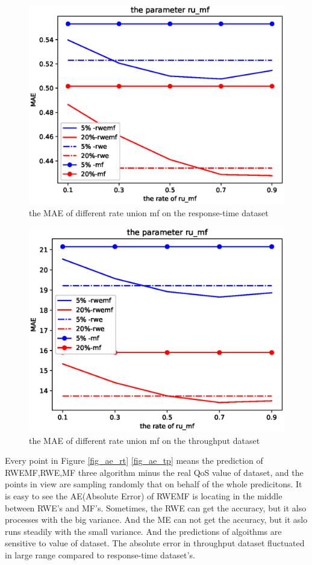 \documentclass[conference]{IEEEtran}
\begin{document}
\begin{figure}[H] 
\centering  
\includegraphics[width=0.45\paperwidth]{rumf_rt.eps}  
\caption{the MAE of different rate union mf on the response-time dataset }  
\label{fig_rumf_rt}  
\end{figure} 

\begin{figure}[H] 
\centering  
\includegraphics[width=0.45\paperwidth]{rumf_tp.eps}  
\caption{the MAE of different rate union mf  on the throughput dataset }  
\label{fig_rumf_tp}  
\end{figure} 

\par Every point in Figure \ref{fig_ae_rt} \ref{fig_ae_tp} means the prediction of RWEMF,RWE,MF three algorithm minus the real QoS value of dataset, and the points in view are sampling randomly that on behalf of the whole predicitons. It is easy to see the AE(Absolute Error) of RWEMF is locating in the middle between RWE's and MF's. Sometimes, the RWE can get the accuracy, but it also processes with the big variance. And the ME can not get the accuracy, but it aslo runs steadily with the small variance. And the predictions of algoithms are sensitive to value of dataset. The absolute error in throughput dataset fluctuated in large range compared to response-time dataset's.
\end{document}

